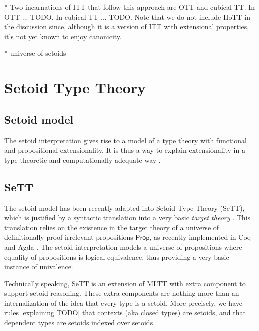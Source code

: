 \documentclass{easychair}
\newcommand{\Prop}{\textsf{Prop}}
\begin{document}
* Two incarnations of ITT that follow this approach are OTT and cubical TT. In OTT
... TODO. In cubical TT ... TODO. Note that we do not include HoTT in the
discussion since, although it is a version of ITT with extensional properties,
it's not yet known to enjoy canonicity.

* universe of setoids



\section{Setoid Type Theory}

\subsection{Setoid model}

The setoid interpretation gives rise to a model of a type theory with functional
and propositional extensionality. It is thus a way to explain extensionality in
a type-theoretic and computationally adequate way \cite{setoid-model}. 




\subsection{SeTT}

The setoid model has been recently adapted into Setoid Type Theory (SeTT), which
is justified by a syntactic translation into a very basic \emph{target theory}
\cite{mpc19}. This translation relies on the existence in the target theory of a
universe of definitionally proof-irrelevant propositions $\Prop$, as recently
implemented in Coq and Agda \cite{gilbert}. The setoid interpretation models a
universe of propositions where equality of propositions is logical equivalence,
thus providing a very basic instance of univalence.

Technically speaking, SeTT is an extension of MLTT with extra component to
support setoid reasoning. These extra components are nothing more than an
internalization of the idea that every type is a setoid. More precisely, we have
rules [explaining TODO] that contexts (aka closed types) are setoids, and that
dependent types are setoids indexed over setoids.
\end{document}
